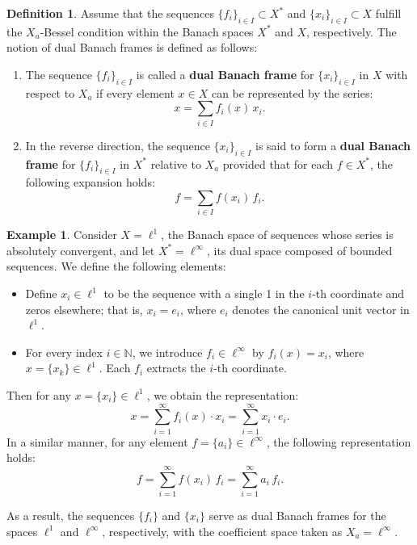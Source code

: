 \documentclass[12pt]{article}
\theoremstyle{definition}
\newtheorem{definition}[theorem]{Definition}
\newtheorem{example}[theorem]{Example}
\theoremstyle{remark}
\begin{document}
\begin{definition}
Assume that the sequences \( \{f_i\}_{i \in I} \subset X^* \) and \( \{x_i\}_{i \in I} \subset X \) fulfill the \( X_a \)-Bessel condition within the Banach spaces \( X^* \) and \( X \), respectively. The notion of dual Banach frames is defined as follows:

\begin{enumerate}
  \item The sequence \( \{f_i\}_{i \in I} \) is called a \textbf{dual Banach frame} for \( \{x_i\}_{i \in I} \) in \( X \) with respect to \( X_a \) if every element \( x \in X \) can be represented by the series:
  \[
  x = \sum_{i \in I} f_i(x) \, x_i.
  \]

  \item In the reverse direction, the sequence \( \{x_i\}_{i \in I} \) is said to form a \textbf{dual Banach frame} for \( \{f_i\}_{i \in I} \) in \( X^* \) relative to \( X_a \) provided that for each \( f \in X^* \), the following expansion holds:
  \[
  f = \sum_{i \in I} f(x_i) \, f_i.
  \]
\end{enumerate}
\end{definition}

\begin{example}
Consider \( X = \ell^1 \), the Banach space of sequences whose series is absolutely 
convergent, and let \( X^* = \ell^\infty \), its dual space composed of bounded sequences. We define the following elements:
\begin{itemize}
\item Define \( x_i \in \ell^1 \) to be the sequence with a single 1 in the \( i \)-th coordinate and zeros elsewhere; that is, \( x_i = e_i \), where \( e_i \) denotes the canonical unit vector in \( \ell^1 \).
  \item For every index \( i \in \mathbb{N} \), we introduce \( f_i \in \ell^\infty \) by \( f_i(x) = x_i \), where \( x = \{x_k\} \in \ell^1 \). Each \( f_i \) extracts the \( i \)-th coordinate.
\end{itemize}

Then for any \( x = \{x_i\} \in \ell^1 \), we obtain the representation:
\[
x = \sum_{i=1}^\infty f_i(x) \cdot x_i = \sum_{i=1}^\infty x_i \cdot e_i.
\]
In a similar manner, for any element \( f = \{a_i\} \in \ell^\infty \), the following representation holds:
\[
f = \sum_{i=1}^\infty f(x_i) \, f_i = \sum_{i=1}^\infty a_i \, f_i.
\]

As a result, the sequences \( \{f_i\} \) and \( \{x_i\} \) serve as dual Banach frames for the spaces \( \ell^1 \) and \( \ell^\infty \), respectively, with the coefficient space taken as \( X_a = \ell^\infty \).


\end{example}
\end{document}
